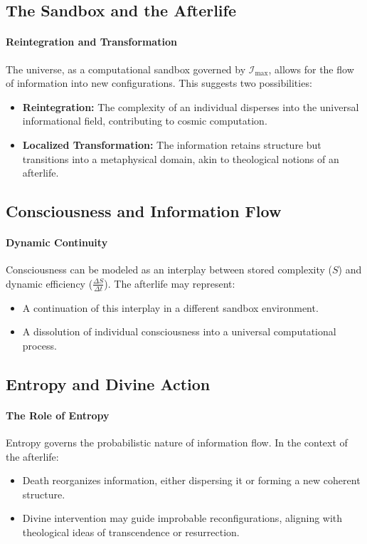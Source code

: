 \documentclass[12pt]{article}
\begin{document}
\subsection{The Sandbox and the Afterlife}
\paragraph{Reintegration and Transformation}
The universe, as a computational sandbox governed by \(\mathcal{I}_{\text{max}}\), allows for the flow of information into new configurations. This suggests two possibilities:
\begin{itemize}
    \item \textbf{Reintegration:} The complexity of an individual disperses into the universal informational field, contributing to cosmic computation.
    \item \textbf{Localized Transformation:} The information retains structure but transitions into a metaphysical domain, akin to theological notions of an afterlife.
\end{itemize}

\subsection{Consciousness and Information Flow}
\paragraph{Dynamic Continuity}
Consciousness can be modeled as an interplay between stored complexity (\(S\)) and dynamic efficiency (\(\frac{\Delta S}{\Delta t}\)). The afterlife may represent:
\begin{itemize}
    \item A continuation of this interplay in a different sandbox environment.
    \item A dissolution of individual consciousness into a universal computational process.
\end{itemize}

\subsection{Entropy and Divine Action}
\paragraph{The Role of Entropy}
Entropy governs the probabilistic nature of information flow. In the context of the afterlife:
\begin{itemize}
    \item Death reorganizes information, either dispersing it or forming a new coherent structure.
    \item Divine intervention may guide improbable reconfigurations, aligning with theological ideas of transcendence or resurrection.
\end{itemize}
\end{document}
